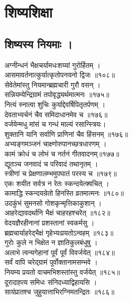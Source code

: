 \chapter{शिष्यशिक्षा}

\section{शिष्यस्य नियमाः ।}

अग्नीन्धनं भैक्षचर्यामधःशय्यां गुरोर्हितम् ।\\[-2mm]
आसमावर्तनात्कुर्यात्कृतोपनयनो द्विजः ॥१०८॥\\
सेवेतेमांस्तु नियमान्ब्रह्मचारी गुरौ वसन् ।\\[-2mm]
सन्नियम्येन्द्रिग्रामं तपोवृद्ध्यर्थमात्मनः ॥१७५॥\\
नित्यं स्नात्वा शुचिः कुर्याद्देवर्षिपितृतर्पणम् ।\\[-2mm]
देवताभ्यर्चनं चैव समिदाधानमेव च ॥१७६॥\\
वर्जयेन्मधु मांसं च गन्धं माल्यं रसान्स्त्रियः।\\[-2mm]
शुक्तानि यानि सर्वाणि प्राणिनां चैव हिंसनम् ॥१७६॥\\
अभ्यङ्गमञ्जनं चाक्ष्णोरुपानच्छत्रधारणम् ।\\[-2mm]
कामं क्रोधं च लोभं च नर्तनं गीतवादनम्॥१७७॥\\
द्यूतञ्च जनवादं च परिवादं तथानृतम् ।\\[-2mm]
स्त्रीणां च प्रेक्षणालम्भमुपघातं परस्य च ॥१७९॥\\
एकः शयीत सर्वत्र न रेतः स्कन्दयेत्क्वचित् ।\\[-2mm]
कामाद्धि स्कन्दयन्रेतो हिनस्ति व्रतमात्मनः ॥१८०॥\\
उदकुंभं सुमनसो गोशकृन्मृत्तिकाकुशान् ।\\[-2mm]
आहरेद्यावदर्थानि भैक्षं चाहरहश्चरेत् ॥१८२॥\\
वेदयज्ञैरहीनानां प्रशस्तानां स्वकर्मसु ।\\[-2mm]
ब्रह्मचार्याहरेद्भैक्षं गृहेभ्यःप्रयतोऽन्वहम् ॥१८३॥\\
गुरोः कुले न भिक्षेत न ज्ञातिकुलबंधुषु ।\\[-2mm]
अलाभे त्वन्यगेहानां पूर्वं पूर्वं विवर्जयेत् ॥१८४॥\\
सर्वं वापि चरेद्ग्रामं पूर्वोक्तानामसम्भवे ।\\[-2mm]
नियम्य प्रयतो वाचमभिशस्तांस्तु वर्जयेत् ॥१८५॥\\
दूरादाह्त्य समिधः संनिदध्याद्विहायसि ।\\[-2mm]
सायंप्रातश्च जुहुयात्ताभिरग्निमतन्द्रितः ॥१८६॥\\
